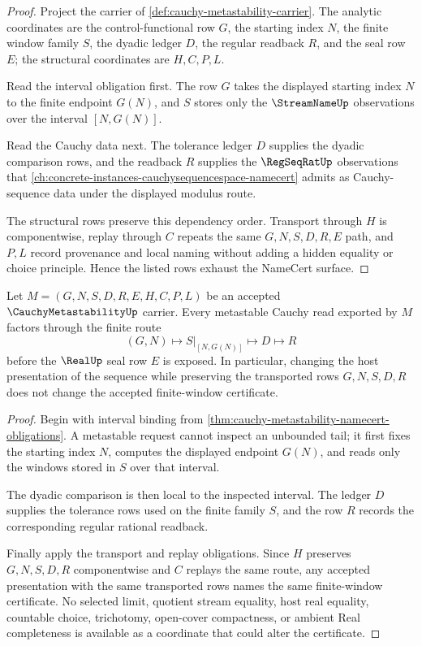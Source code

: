 \begin{proof}
Project the carrier of \autoref{def:cauchy-metastability-carrier}. The analytic coordinates are the control-functional row $G$, the starting index $N$, the finite window family $S$, the dyadic ledger $D$, the regular readback $R$, and the seal row $E$; the structural coordinates are $H,C,P,L$.

Read the interval obligation first. The row $G$ takes the displayed starting index $N$ to the finite endpoint $G(N)$, and $S$ stores only the $\StreamNameUp$ observations over the interval $[N,G(N)]$.

Read the Cauchy data next. The tolerance ledger $D$ supplies the dyadic comparison rows, and the readback $R$ supplies the $\RegSeqRatUp$ observations that \autoref{ch:concrete-instances-cauchysequencespace-namecert} admits as Cauchy-sequence data under the displayed modulus route.

The structural rows preserve this dependency order. Transport through $H$ is componentwise, replay through $C$ repeats the same $G,N,S,D,R,E$ path, and $P,L$ record provenance and local naming without adding a hidden equality or choice principle. Hence the listed rows exhaust the NameCert surface.
\end{proof}

\begin{theorem}
\label{thm:cauchy-metastability-finite-window-stability}
Let $M=(G,N,S,D,R,E,H,C,P,L)$ be an accepted $\CauchyMetastabilityUp$ carrier. Every metastable Cauchy read exported by $M$ factors through the finite route
$$
(G,N)\longmapsto S|_{[N,G(N)]}\longmapsto D\longmapsto R
$$
before the $\RealUp$ seal row $E$ is exposed. In particular, changing the host presentation of the sequence while preserving the transported rows $G,N,S,D,R$ does not change the accepted finite-window certificate.
\end{theorem}
\begin{proof}
Begin with interval binding from \autoref{thm:cauchy-metastability-namecert-obligations}. A metastable request cannot inspect an unbounded tail; it first fixes the starting index $N$, computes the displayed endpoint $G(N)$, and reads only the windows stored in $S$ over that interval.

The dyadic comparison is then local to the inspected interval. The ledger $D$ supplies the tolerance rows used on the finite family $S$, and the row $R$ records the corresponding regular rational readback.

Finally apply the transport and replay obligations. Since $H$ preserves $G,N,S,D,R$ componentwise and $C$ replays the same route, any accepted presentation with the same transported rows names the same finite-window certificate. No selected limit, quotient stream equality, host real equality, countable choice, trichotomy, open-cover compactness, or ambient Real completeness is available as a coordinate that could alter the certificate.
\end{proof}

